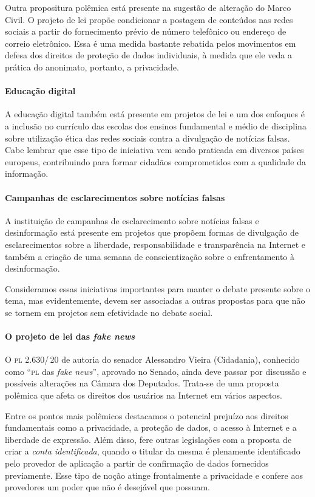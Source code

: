 Outra propositura polêmica está presente na sugestão de alteração do Marco Civil. O projeto de lei propõe condicionar a postagem de conteúdos nas redes sociais a partir do fornecimento prévio de número telefônico ou endereço de correio eletrônico. Essa é uma medida bastante rebatida pelos movimentos em defesa dos direitos de proteção de dados individuais, à medida que ele veda a prática do anonimato, portanto, a privacidade.

\paragraph{Educação digital} A educação digital também está presente em projetos de lei e um dos enfoques é a inclusão no currículo das escolas dos ensinos fundamental e médio de disciplina sobre utilização ética das redes sociais contra a divulgação de notícias falsas. Cabe lembrar que esse tipo de iniciativa vem sendo praticada em diversos países europeus, contribuindo para formar cidadãos comprometidos com a qualidade da informação.

\paragraph{Campanhas de esclarecimentos sobre notícias falsas} A instituição de campanhas de esclarecimento sobre notícias falsas e desinformação está presente em projetos que propõem formas de divulgação de esclarecimentos sobre a liberdade, responsabilidade e transparência na Internet e também a criação de uma semana de conscientização sobre o enfrentamento à desinformação.

Consideramos essas iniciativas importantes para manter o debate presente sobre o tema, mas evidentemente, devem ser associadas a outras propostas para que não se tornem em projetos sem efetividade no debate social.

\paragraph{O projeto de lei das \textit{fake news}} O \textsc{pl} 2.630/\,20 de autoria do senador Alessandro Vieira (Cidadania), conhecido como ``\textsc{pl} das \textit{fake news}'', aprovado no Senado, ainda deve passar por discussão e possíveis alterações na Câmara dos Deputados. Trata-se de uma proposta polêmica que afeta os direitos dos usuários na Internet em vários aspectos.

Entre os pontos mais polêmicos destacamos o potencial prejuízo aos direitos fundamentais como a privacidade, a proteção de dados, o acesso à Internet e a liberdade de expressão. Além disso, fere outras legislações com a proposta de criar a \textit{conta identificada}, quando o titular da mesma é plenamente identificado pelo provedor de aplicação a partir de confirmação de dados fornecidos previamente. Esse tipo de noção atinge frontalmente a privacidade e confere aos provedores um poder que não é desejável que possuam.

